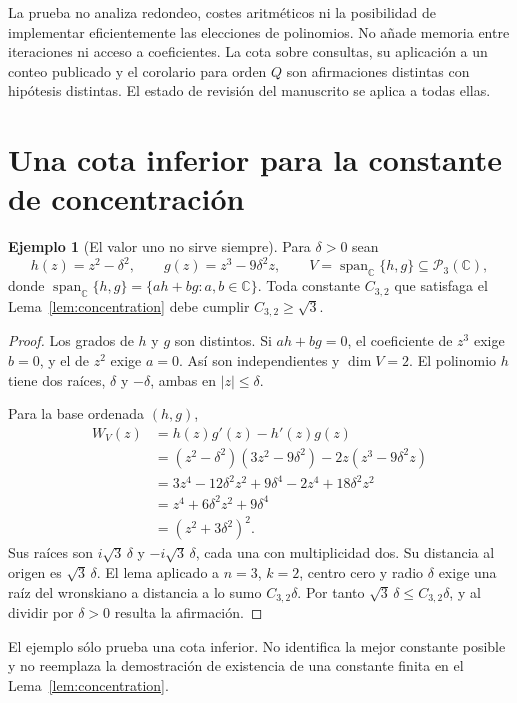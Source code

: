 \documentclass[11pt,a4paper]{article}
\numberwithin{equation}{section}
\theoremstyle{definition}
\newtheorem{example}[theorem]{Ejemplo}
\theoremstyle{remark}
\newcommand{\C}{\mathbb C}
\newcommand{\PP}{\mathcal P}
\DeclareMathOperator{\spanop}{span}
\begin{document}
La prueba no analiza redondeo, costes aritméticos ni la posibilidad de implementar eficientemente las elecciones de polinomios. No añade memoria entre iteraciones ni acceso a coeficientes. La cota sobre consultas, su aplicación a un conteo publicado y el corolario para orden $Q$ son afirmaciones distintas con hipótesis distintas. El estado de revisión del manuscrito se aplica a todas ellas.

\clearpage
\appendix
\section{Una cota inferior para la constante de concentración}\label{app:constant}

\begin{example}[El valor uno no sirve siempre]\label{ex:constant}
Para $\delta>0$ sean
\[
h(z)=z^2-\delta^2,\qquad g(z)=z^3-9\delta^2z,\qquad
V=\spanop_\C\{h,g\}\subseteq\PP_3(\C),
\]
donde $\spanop_\C\{h,g\}=\{ah+bg:a,b\in\C\}$. Toda constante $C_{3,2}$ que satisfaga el Lema~\ref{lem:concentration} debe cumplir $C_{3,2}\ge\sqrt3$.
\end{example}
\begin{proof}
Los grados de $h$ y $g$ son distintos. Si $ah+bg=0$, el coeficiente de $z^3$ exige $b=0$, y el de $z^2$ exige $a=0$. Así son independientes y $\dim V=2$. El polinomio $h$ tiene dos raíces, $\delta$ y $-\delta$, ambas en $|z|\le\delta$.

Para la base ordenada $(h,g)$,
\begin{align*}
W_V(z)
&=h(z)g'(z)-h'(z)g(z)\\
&=(z^2-\delta^2)(3z^2-9\delta^2)-2z(z^3-9\delta^2z)\\
&=3z^4-12\delta^2z^2+9\delta^4-2z^4+18\delta^2z^2\\
&=z^4+6\delta^2z^2+9\delta^4\\
&=(z^2+3\delta^2)^2.
\end{align*}
Sus raíces son $i\sqrt3\,\delta$ y $-i\sqrt3\,\delta$, cada una con multiplicidad dos. Su distancia al origen es $\sqrt3\,\delta$. El lema aplicado a $n=3$, $k=2$, centro cero y radio $\delta$ exige una raíz del wronskiano a distancia a lo sumo $C_{3,2}\delta$. Por tanto $\sqrt3\,\delta\le C_{3,2}\delta$, y al dividir por $\delta>0$ resulta la afirmación.
\end{proof}

El ejemplo sólo prueba una cota inferior. No identifica la mejor constante posible y no reemplaza la demostración de existencia de una constante finita en el Lema~\ref{lem:concentration}.
\end{document}
